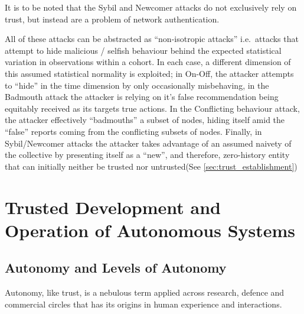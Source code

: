 It is to be noted that the Sybil and Newcomer attacks do not exclusively rely on trust, but instead are a problem of network authentication.

All of these attacks can be abstracted as ``non-isotropic attacks'' i.e.\ attacks that attempt to hide malicious / selfish behaviour behind the expected statistical variation in observations within a cohort.
In each case, a different dimension of this assumed statistical normality is exploited; in On-Off, the attacker attempts to ``hide'' in the time dimension by only occasionally misbehaving, in the Badmouth attack the attacker is relying on it's false recommendation being equitably received as its targets true actions. 
In the Conflicting behaviour attack, the attacker effectively ``badmouths'' a subset of nodes, hiding itself amid the ``false'' reports coming from the conflicting subsets of nodes. 
Finally, in Sybil/Newcomer attacks the attacker takes advantage of an assumed naivety of the collective by presenting itself as a ``new'', and therefore, zero-history entity that can initially neither be trusted nor untrusted(See \autoref{sec:trust_establishment})


\section{Trusted Development and Operation of Autonomous Systems}\label{sec:trust_autonomy}

\subsection{Autonomy and Levels of Autonomy}

Autonomy, like trust, is a nebulous term applied across research, defence and commercial circles that has its origins in human experience and interactions. 

